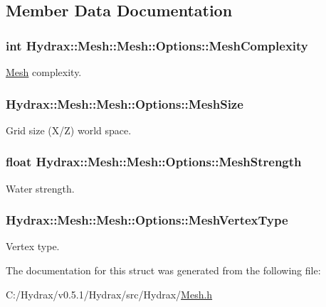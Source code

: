 \subsection{Member Data Documentation}
\hypertarget{struct_hydrax_1_1_mesh_1_1_options_5d17fbbf820887197a25f00b91ae8812}{
\subsubsection[{MeshComplexity}]{\setlength{\rightskip}{0pt plus 5cm}int Hydrax::Mesh::Mesh::Options::MeshComplexity}}
\label{struct_hydrax_1_1_mesh_1_1_options_5d17fbbf820887197a25f00b91ae8812}


\hyperlink{class_hydrax_1_1_mesh}{Mesh} complexity. 

\hypertarget{struct_hydrax_1_1_mesh_1_1_options_55a90d2808a8604950fc36323dc242c2}{
\subsubsection[{MeshSize}]{ Hydrax::Mesh::Mesh::Options::MeshSize}}
\label{struct_hydrax_1_1_mesh_1_1_options_55a90d2808a8604950fc36323dc242c2}


Grid size (X/Z) world space. 

\hypertarget{struct_hydrax_1_1_mesh_1_1_options_9b75bf291c99d5041b692c48663859a1}{
\subsubsection[{MeshStrength}]{\setlength{\rightskip}{0pt plus 5cm}float Hydrax::Mesh::Mesh::Options::MeshStrength}}
\label{struct_hydrax_1_1_mesh_1_1_options_9b75bf291c99d5041b692c48663859a1}


Water strength. 

\hypertarget{struct_hydrax_1_1_mesh_1_1_options_2593d9978ddbc61ab9f90b78b7f14809}{
\subsubsection[{MeshVertexType}]{ Hydrax::Mesh::Mesh::Options::MeshVertexType}}
\label{struct_hydrax_1_1_mesh_1_1_options_2593d9978ddbc61ab9f90b78b7f14809}


Vertex type. 



The documentation for this struct was generated from the following file:\begin{CompactItemize}
\item 
C:/Hydrax/v0.5.1/Hydrax/src/Hydrax/\hyperlink{_mesh_8h}{Mesh.h}\end{CompactItemize}
